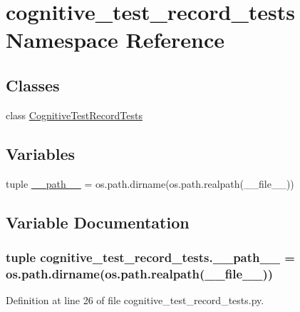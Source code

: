\hypertarget{namespacecognitive__test__record__tests}{\section{cognitive\-\_\-test\-\_\-record\-\_\-tests Namespace Reference}
\label{namespacecognitive__test__record__tests}
}
\subsection*{Classes}
\begin{DoxyCompactItemize}
\item 
class \hyperlink{classcognitive__test__record__tests_1_1CognitiveTestRecordTests}{Cognitive\-Test\-Record\-Tests}
\end{DoxyCompactItemize}
\subsection*{Variables}
\begin{DoxyCompactItemize}
\item 
tuple \hyperlink{namespacecognitive__test__record__tests_a6a3a59666170e69210b707b217dfaa27}{\-\_\-\-\_\-path\-\_\-\-\_\-} = os.\-path.\-dirname(os.\-path.\-realpath(\-\_\-\-\_\-file\-\_\-\-\_\-))
\end{DoxyCompactItemize}


\subsection{Variable Documentation}
\hypertarget{namespacecognitive__test__record__tests_a6a3a59666170e69210b707b217dfaa27}{
\subsubsection[{\-\_\-\-\_\-path\-\_\-\-\_\-}]{\setlength{\rightskip}{0pt plus 5cm}tuple cognitive\-\_\-test\-\_\-record\-\_\-tests.\-\_\-\-\_\-path\-\_\-\-\_\- = os.\-path.\-dirname(os.\-path.\-realpath(\-\_\-\-\_\-file\-\_\-\-\_\-))}}\label{namespacecognitive__test__record__tests_a6a3a59666170e69210b707b217dfaa27}


Definition at line 26 of file cognitive\-\_\-test\-\_\-record\-\_\-tests.\-py.

